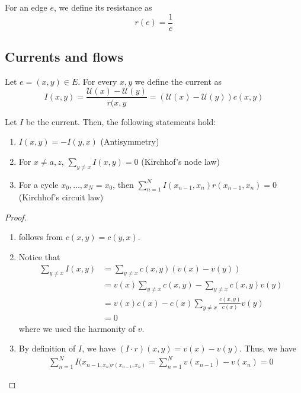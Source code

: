 \begin{defn}[Resistance]
    For an edge $e$, we define its resistance as
    \[r(e)= \frac{1}{e}\]
\end{defn}


\subsection{Currents and flows}

\begin{defn}[Current]
    Let $e=(x,y) \in E$. For every \(x,y\) we define the current as
    \[I(x,y) = \frac{\mathcal{U}(x)-\mathcal{U}(y)}{r(x,y} = \left(\mathcal{U}(x)-\mathcal{U}(y)\right) c(x,y)\]
\end{defn}


\begin{lem}
    Let $I$ be the current. Then, the following statements hold:
    \begin{enumerate}
      \item \(I(x,y) = -I(y,x)\) (Antisymmetry) 
      \item For $x\neq a,z$, $\sum_{y\neq x} I(x,y) = 0$ (Kirchhof's node law)
      \item For a cycle ${x}_{0} , \dots , {x}_{N}=x_0 $, then \(\sum_{n=1}^{N} I(x_{n-1},x_n)r(x_{n-1},x_n) = 0\) (Kirchhof's circuit law)
    \end{enumerate}
    
\end{lem}

\begin{proof} \,
    \begin{enumerate}
      \item follows from $c(x,y)=c(y,x)$.
      \item Notice that 
        \begin{align*}
          \sum_{y\neq x}I(x,y) &= \sum_{y\neq x}c(x,y) \left(v(x)-v(y)\right) \\
                               &=v(x)\sum_{y\neq x}c(x,y) - \sum_{y\neq x}c(x,y)v(y) \\
                               &=v(x)c(x) - c(x)\sum_{y\neq x}\frac{c(x,y)}{c(x)}v(y) \\
                               &=0
        \end{align*}
        where we used the harmonity of $v$.
      \item By definition of $I$, we have $(I\cdot r)(x,y)=v(x)-v(y)$. Thus, we have 
        \begin{align*}
          \sum_{n=1}^{N} I(x_{n-1,x_n)r(x_{n-1},x_n)} = \sum_{n=1}^{N} v(x_{n-1})-v(x_n) = 0
        \end{align*}        
    \end{enumerate}
\end{proof}


